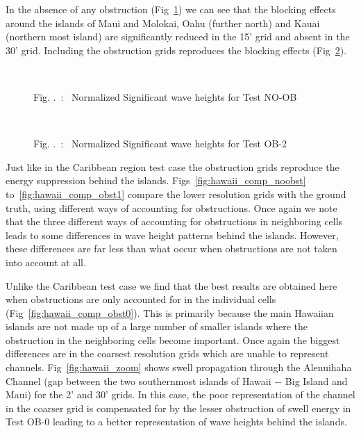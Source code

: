 \documentclass[12pt]{article}
\newcounter{myfigno}[section]
\newenvironment{myfig}[1]{\begin{figure}[#1]
                        \refstepcounter{myfigno}}
                       {\end{figure}}
\newcommand{\myfcapc}[1]{\begin{center} \ff Fig. \themyfigno\ :~ #1
                        \end{center}}
\renewcommand{\themyfigno}{\thesection.\arabic{myfigno}}
\begin{document}
In the absence of any obstruction (Fig~\ref{fig:hawaii_noobstr}) we can see that the blocking effects around the islands of Maui and Molokai, Oahu (further north) and Kauai (northern most island) are significantly reduced in the 15' grid and absent in the 30' grid. Including the obstruction grids reproduces the blocking effects (Fig~\ref{fig:hawaii_obstr1}). 
 
\setcounter{subfigure}{0}
\begin{myfig}{tbp}
\\
\myfcapc{Normalized Significant wave heights for Test NO-OB}
\label{fig:hawaii_noobstr}
\end{myfig}

\setcounter{subfigure}{0}
\begin{myfig}{tbp}
\\
\myfcapc{Normalized Significant wave heights for Test OB-2}
\label{fig:hawaii_obstr1}
\end{myfig}

Just like in the Caribbean region test case the obstruction grids reproduce the energy suppression behind the islands. Figs~\ref{fig:hawaii_comp_noobst} to~\ref{fig:hawaii_comp_obst1} compare the lower resolution grids with the ground truth, using different ways of accounting for obstructions. Once again we note that the three different ways of accounting for obstructions in neighboring cells leads to some differences in wave height patterns behind the islands. However, these differences are far less than what occur when obstructions are not taken into account at all. 

Unlike the Caribbean test case we find that the best results are obtained here when obstructions are only accounted for in the individual cells (Fig~\ref{fig:hawaii_comp_obst0}). This is primarily because the main Hawaiian islands are not made up of a large number of smaller islands where the obstruction in the neighboring cells become important. Once again the biggest differences are in the coarsest resolution grids which are unable to represent channels. Fig~\ref{fig:hawaii_zoom} shows swell propagation through the Alenuihaha Channel (gap between the two southernmost islands of Hawaii $-$ Big Island and Maui) for the 2' and 30' grids. In this case, the poor representation of the channel in the coarser grid is compensated for by the lesser obstruction of swell energy in Test OB-0 leading to a better representation of wave heights behind the islands. 
\end{document}
